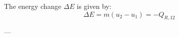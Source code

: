 The energy change \( \Delta E \) is given by:  
\[
\Delta E = m \left( u_2 - u_1 \right) = -Q_{R,12}
\]  

---
